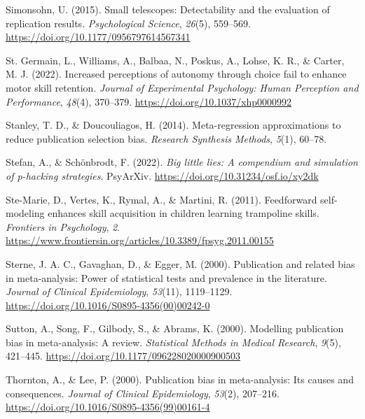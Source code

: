 \documentclass[
  man, donotrepeattitle,mask,floatsintext]{apa7}
\newlength{\cslhangindent}
\newlength{\cslentryspacingunit} %
\newenvironment{CSLReferences}[2] %
 {%
  \setlength{\parindent}{0pt}
  \ifodd #1
  \let\oldpar\par
  \def\par{\hangindent=\cslhangindent\oldpar}
  \fi
  \setlength{\parskip}{#2\cslentryspacingunit}
 }%
 {}
\begin{document}
\begin{CSLReferences}{1}{0}
\leavevmode{}%
Simonsohn, U. (2015). Small telescopes: Detectability and the evaluation of replication results. \emph{Psychological Science}, \emph{26}(5), 559--569. \url{https://doi.org/10.1177/0956797614567341}

\leavevmode{}%
St. Germain, L., Williams, A., Balbaa, N., Poskus, A., Lohse, K. R., \& Carter, M. J. (2022). Increased perceptions of autonomy through choice fail to enhance motor skill retention. \emph{Journal of Experimental Psychology: Human Perception and Performance}, \emph{48}(4), 370--379. \url{https://doi.org/10.1037/xhp0000992}

\leavevmode{}%
Stanley, T. D., \& Doucouliagos, H. (2014). Meta-regression approximations to reduce publication selection bias. \emph{Research Synthesis Methods}, \emph{5}(1), 60--78.

\leavevmode{}%
Stefan, A., \& Schönbrodt, F. (2022). \emph{Big little lies: A compendium and simulation of p-hacking strategies}. {PsyArXiv}. \url{https://doi.org/10.31234/osf.io/xy2dk}

\leavevmode{}%
Ste-Marie, D., Vertes, K., Rymal, A., \& Martini, R. (2011). Feedforward self-modeling enhances skill acquisition in children learning trampoline skills. \emph{Frontiers in Psychology}, \emph{2}. \url{https://www.frontiersin.org/articles/10.3389/fpsyg.2011.00155}

\leavevmode{}%
Sterne, J. A. C., Gavaghan, D., \& Egger, M. (2000). Publication and related bias in meta-analysis: Power of statistical tests and prevalence in the literature. \emph{Journal of Clinical Epidemiology}, \emph{53}(11), 1119--1129. \url{https://doi.org/10.1016/S0895-4356(00)00242-0}

\leavevmode{}%
Sutton, A., Song, F., Gilbody, S., \& Abrams, K. (2000). Modelling publication bias in meta-analysis: A review. \emph{Statistical Methods in Medical Research}, \emph{9}(5), 421--445. \url{https://doi.org/10.1177/096228020000900503}

\leavevmode{}%
Thornton, A., \& Lee, P. (2000). Publication bias in meta-analysis: Its causes and consequences. \emph{Journal of Clinical Epidemiology}, \emph{53}(2), 207--216. \url{https://doi.org/10.1016/S0895-4356(99)00161-4}


\end{CSLReferences}
\end{document}
